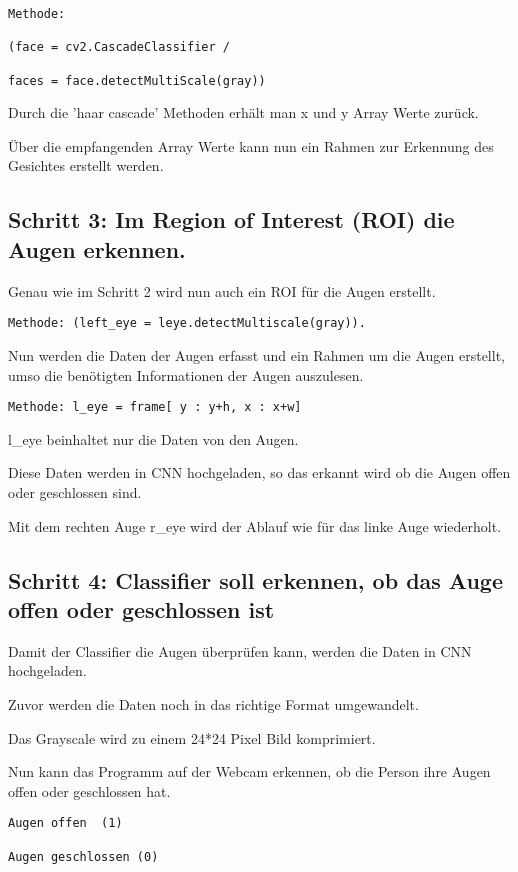 \begin{lstlisting}
Methode: 

(face = cv2.CascadeClassifier / 

faces = face.detectMultiScale(gray))
\end{lstlisting}

Durch die 'haar cascade' Methoden erhält man x und y Array Werte zurück. 

Über die empfangenden Array Werte kann nun ein Rahmen zur Erkennung des Gesichtes erstellt werden. 


\subsection{Schritt 3: Im Region of Interest (ROI) die Augen erkennen.}

Genau wie im Schritt 2 wird nun auch ein ROI für die Augen erstellt. 

\begin{lstlisting}
Methode: (left_eye = leye.detectMultiscale(gray)).
\end{lstlisting}

Nun werden die Daten der Augen erfasst und ein Rahmen um die Augen erstellt, 
umso die benötigten Informationen der Augen auszulesen.

\begin{lstlisting}
Methode: l_eye = frame[ y : y+h, x : x+w] 
\end{lstlisting}
 
l\_eye beinhaltet nur die Daten von den Augen.

Diese Daten werden in CNN hochgeladen, so das erkannt wird ob die Augen offen oder geschlossen sind. 

Mit dem rechten Auge r\_eye wird der Ablauf wie für das linke Auge wiederholt.

\subsection{Schritt 4: Classifier soll erkennen, ob das Auge offen oder geschlossen ist}

Damit der Classifier die Augen überprüfen kann, werden die Daten in CNN hochgeladen. 

Zuvor werden die Daten noch in das richtige Format umgewandelt. 

Das Grayscale wird zu einem 24*24 Pixel Bild komprimiert. 

Nun kann das Programm auf der Webcam erkennen, ob die Person ihre Augen offen oder geschlossen hat.
\begin{lstlisting}
Augen offen  (1)

Augen geschlossen (0)
\end{lstlisting}

